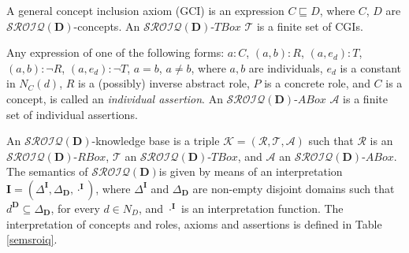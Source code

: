 \documentclass[a4paper]{llncs}
\newcommand{\sroiqd}{\ensuremath{\mathcal{SROIQ}(\D)}}
\newcommand{\I}{\mathbf{I}}
\newcommand{\D}{\mathbf{D}}
\begin{document}
A general concept inclusion axiom (GCI) is an expression $C \sqsubseteq D$, where $C$, $D$ are \sroiqd-concepts. An \sroiqd-$TBox$ $\mathcal{T}$ is a finite set of CGIs.

Any expression of one of the following forms: $a : C$, $(a,b) : R$, $(a, e_d) : T$, $(a,b) : \neg R$, $(a,e_d) : \neg T$, $a=b$, $ a \neq b$, where $a,b$ are individuals, $e_d$ is a constant in $N_{C}(d)$, $R$ is a (possibly) inverse abstract role, $P$ is a concrete role, and $C$ is a concept, is called an \emph{individual assertion}. An \sroiqd-$ABox$ $\mathcal{A}$ is a finite set of individual assertions.

An \sroiqd-knowledge base is a triple $\mathcal{K} = (\mathcal{R}, \mathcal{T}, \mathcal{A})$ such that $\mathcal{R}$ is an \sroiqd-$RBox$, $\mathcal{T}$ an \sroiqd-$TBox$, and $\mathcal{A}$ an \sroiqd-$ABox$.
The semantics of \sroiqd\space is given by means of an interpretation $\I= (\Delta^\I, \Delta_{\D}, \cdot^\I)$, where $\Delta^\I$ and $\Delta_{\D}$ are non-empty disjoint domains such that $d^\D\subseteq \Delta_{\D}$, for every $d \in N_{D}$, and
$\cdot^\I$ is an interpretation function.
The interpretation of concepts and roles, axioms and assertions is defined in Table \ref{semsroiq}.
\end{document}
